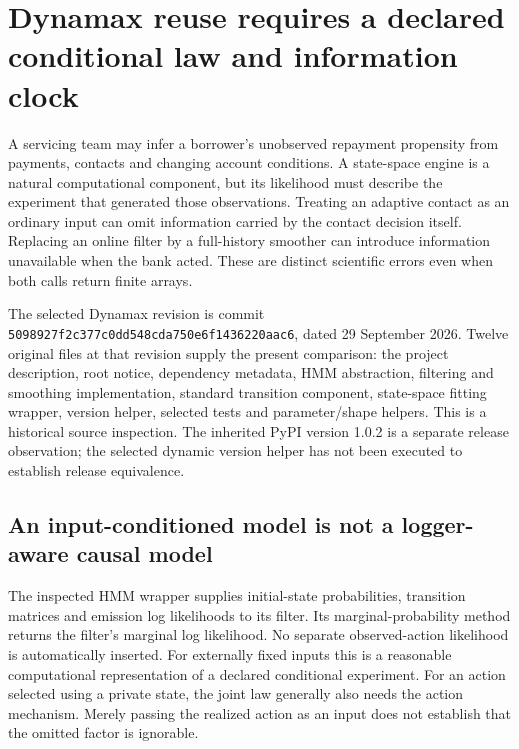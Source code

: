 \section{Dynamax reuse requires a declared conditional law and information clock}
\label{exec19:dynamax-scope}

A servicing team may infer a borrower's unobserved repayment propensity from
payments, contacts and changing account conditions. A state-space engine is a
natural computational component, but its likelihood must describe the experiment
that generated those observations. Treating an adaptive contact as an ordinary
input can omit information carried by the contact decision itself. Replacing an
online filter by a full-history smoother can introduce information unavailable
when the bank acted. These are distinct scientific errors even when both calls
return finite arrays.

The selected Dynamax revision is commit
\texttt{5098927f2c377c0dd548cda750e6f1436220aac6}, dated 29 September 2026.
Twelve original files at that revision supply the present comparison: the
project description, root notice, dependency metadata, HMM abstraction,
filtering and smoothing implementation, standard transition component,
state-space fitting wrapper, version helper, selected tests and parameter/shape
helpers. This is a historical source inspection. The inherited PyPI version
1.0.2 is a separate release observation; the selected dynamic version helper
has not been executed to establish release equivalence.~\citep{exec19_dynamax_source}

\subsection{An input-conditioned model is not a logger-aware causal model}
\label{exec19:dynamax-logger}

The inspected HMM wrapper supplies initial-state probabilities, transition
matrices and emission log likelihoods to its filter. Its marginal-probability
method returns the filter's marginal log likelihood. No separate observed-action
likelihood is automatically inserted. For externally fixed inputs this is a
reasonable computational representation of a declared conditional experiment.
For an action selected using a private state, the joint law generally also needs
the action mechanism. Merely passing the realized action as an input does not
establish that the omitted factor is ignorable.~\citep{exec19_dynamax_source}

